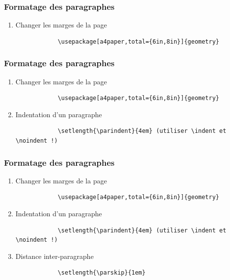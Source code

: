 \documentclass[handout]{beamer}
\begin{document}
	\begin{frame}[fragile=singleslide]
	\frametitle{Formatage des paragraphes}

	\begin{enumerate}
		\item Changer les marges  de la page\\
			\begin{verbatim}
			\usepackage[a4paper,total={6in,8in}]{geometry}
			\end{verbatim}
	\end{enumerate}
\end{frame}

\begin{frame}[fragile=singleslide]
	\frametitle{Formatage des paragraphes}

	\begin{enumerate}
		\item Changer les marges  de la page\\

			\begin{verbatim}
			\usepackage[a4paper,total={6in,8in}]{geometry}
			\end{verbatim}
		\item Indentation d'un paragraphe\\

			\begin{verbatim}
			\setlength{\parindent}{4em} (utiliser \indent et \noindent !)
			\end{verbatim}
	\end{enumerate}
\end{frame}

\begin{frame}[fragile=singleslide]
	\frametitle{Formatage des paragraphes}

	\begin{enumerate}
		\item Changer les marges  de la page\\
			\begin{verbatim}
			\usepackage[a4paper,total={6in,8in}]{geometry}
			\end{verbatim}
		\item Indentation d'un paragraphe\\

			\begin{verbatim}
			\setlength{\parindent}{4em} (utiliser \indent et \noindent !)
			\end{verbatim}
		\item Distance inter-paragraphe\\

			\begin{verbatim}
			\setlength{\parskip}{1em}
			\end{verbatim}
	\end{enumerate}
\end{frame}
\end{document}
